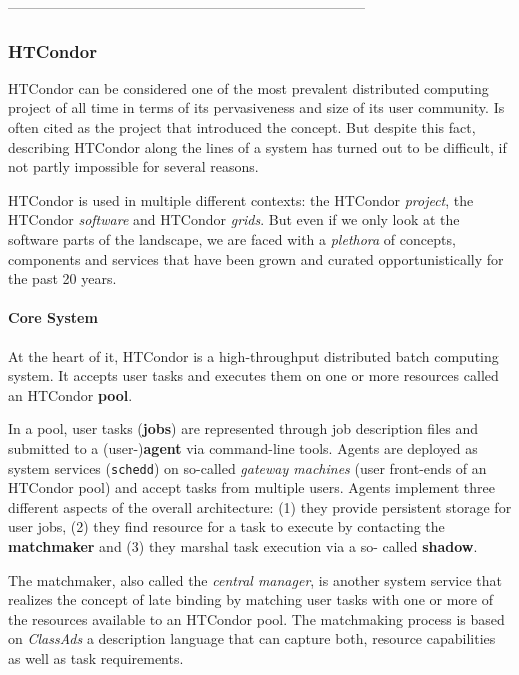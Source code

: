 \documentclass{sig-alternate}
\begin{document}
 -----------------------------------------------------------------------------

\subsubsection{HTCondor}

HTCondor can be considered one of the most prevalent distributed computing
project of all time in terms of its pervasiveness and size of its  user
community.
Is often cited as the project that introduced the \pilotjob concept.
But despite this fact, describing HTCondor along the lines of a \pilotjob
system has turned out to be difficult, if not partly impossible for several
reasons.

HTCondor is used in multiple different contexts: the HTCondor \textit{project},
the HTCondor \textit{software} and HTCondor \textit{grids}. But even if we only
look at the software parts of the landscape, we are faced with a
\textit{plethora} of concepts, components and services that have been grown and
curated opportunistically for the past 20 years.

%
\paragraph{Core System}

At the heart of it, HTCondor is a high-throughput distributed batch computing
system.
It accepts user tasks and executes them on one or more resources called an
HTCondor \textbf{pool}.

In a pool, user tasks (\textbf{jobs}) are represented through job description
files and submitted to a (user-)\textbf{agent} via command-line tools. Agents
are deployed as system services (\texttt{schedd}) on so-called \textit{gateway
machines} (user front-ends of an HTCondor pool) and accept tasks from multiple
users. Agents implement three different aspects of the overall architecture:
(1) they provide persistent storage for user jobs, (2) they find resource for
a task to execute by contacting the \textbf{matchmaker} and (3) they marshal
task execution via a so- called \textbf{shadow}.

The matchmaker, also called the \textit{central manager}, is another system
service that realizes the concept of late binding by matching user tasks with
one or more of the resources available to an HTCondor pool. The matchmaking
process is based on \textit{ClassAds} a description language that can capture
both, resource capabilities as well as task requirements.
\end{document}
